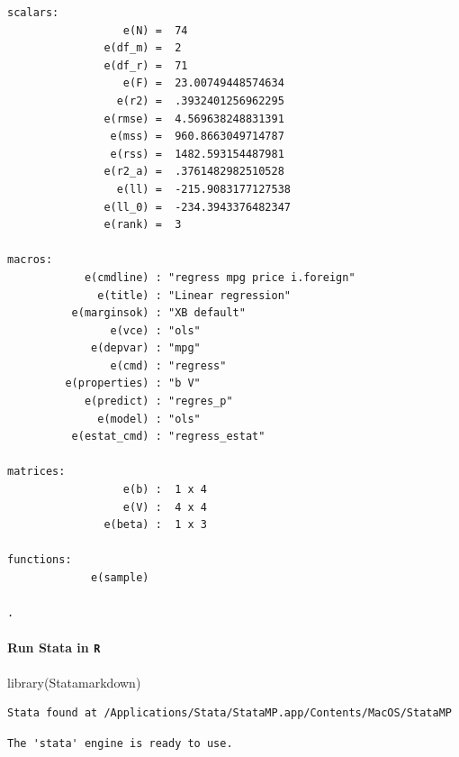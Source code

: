 \documentclass[
  letterpaper,
  DIV=11,
  numbers=noendperiod]{scrartcl}
\let\oldparagraph\paragraph
\renewcommand{\paragraph}[1]{\oldparagraph{#1}\mbox{}}
\newenvironment{Shaded}{\begin{snugshade}}{\end{snugshade}}
\newcommand{\AttributeTok}[1]{\textcolor[rgb]{0.40,0.45,0.13}{#1}}
\newcommand{\FunctionTok}[1]{\textcolor[rgb]{0.28,0.35,0.67}{#1}}
\newcommand{\NormalTok}[1]{\textcolor[rgb]{0.00,0.23,0.31}{#1}}
\newcommand{\OtherTok}[1]{\textcolor[rgb]{0.00,0.23,0.31}{#1}}
\newcommand{\SpecialCharTok}[1]{\textcolor[rgb]{0.37,0.37,0.37}{#1}}
\newcommand{\StringTok}[1]{\textcolor[rgb]{0.13,0.47,0.30}{#1}}
\begin{document}
\begin{verbatim}
scalars:
                  e(N) =  74
               e(df_m) =  2
               e(df_r) =  71
                  e(F) =  23.00749448574634
                 e(r2) =  .3932401256962295
               e(rmse) =  4.569638248831391
                e(mss) =  960.8663049714787
                e(rss) =  1482.593154487981
               e(r2_a) =  .3761482982510528
                 e(ll) =  -215.9083177127538
               e(ll_0) =  -234.3943376482347
               e(rank) =  3

macros:
            e(cmdline) : "regress mpg price i.foreign"
              e(title) : "Linear regression"
          e(marginsok) : "XB default"
                e(vce) : "ols"
             e(depvar) : "mpg"
                e(cmd) : "regress"
         e(properties) : "b V"
            e(predict) : "regres_p"
              e(model) : "ols"
          e(estat_cmd) : "regress_estat"

matrices:
                  e(b) :  1 x 4
                  e(V) :  4 x 4
               e(beta) :  1 x 3

functions:
             e(sample)   

. 
\end{verbatim}

\paragraph{\texorpdfstring{Run Stata in \texttt{R}}{Run Stata in R}}

\begin{Shaded}
\begin{Highlighting}[]
\FunctionTok{library}\NormalTok{(Statamarkdown)}
\end{Highlighting}
\end{Shaded}

\begin{verbatim}
Stata found at /Applications/Stata/StataMP.app/Contents/MacOS/StataMP
\end{verbatim}

\begin{verbatim}
The 'stata' engine is ready to use.
\end{verbatim}

\begin{Shaded}
\end{Shaded}
\end{document}
